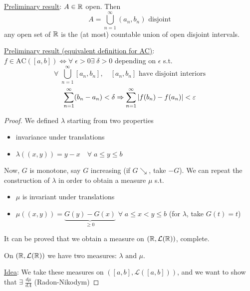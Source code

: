 \noindent\underline{Preliminary result}: \(A \in \mathbb{R}\) open. Then 
\[
    A = \bigcup_{n=1}^{\infty}(a_n, b_n) \mbox{ disjoint}
\]
    any open set of \(\mathbb{R}\) is the (at most) countable union of open disjoint intervals.

\noindent\underline{Preliminary result (equivalent definition for AC)}: \(f \in \mbox{AC}([a,b]) \Leftrightarrow \forall \; \epsilon > 0 \exists \; \delta > 0\) depending on \(\epsilon\) s.t. 
\[
    \forall \; \bigcup_{n=1}^{\infty} [a_n, b_n], \quad [a_n, b_n] \mbox{ have disjoint interiors}
\]
\[
    \sum_{n=1}^{\infty} (b_n -a_n) < \delta \Rightarrow \sum_{n=1}^{\infty} \abs{f(b_n) - f(a_n)} < \varepsilon
\]
\begin{proof}
    We defined \(\lambda\) starting from two properties
    \begin{itemize}
        \item invariance under translations
        \item \(\lambda((x,y)) = y - x \quad \forall \; a \leq  y \leq b\)
    \end{itemize}
    Now, \(G\) is monotone, say \(G\) increasing (if \(G \searrow\), take \(-G\)). We can repeat the construction of \(\lambda\) in order to obtain a measure \(\mu\) s.t. 
    \begin{itemize}
        \item \(\mu\) is invariant under translations
        \item \(\mu((x,y)) = \underbrace{G(y) - G(x)}_{\geq 0}\) \(\forall \; a \leq x < y \leq b\) (for \(\lambda\), take \(G(t) = t\))
    \end{itemize}
It can be proved that we obtain a measure on \((\mathbb{R}, \mathcal{L}(\mathbb{R}))\), complete.

On \((\mathbb{R}, \mathcal{L}(\mathbb{R}))\) we have two measures: \(\lambda \mbox{ and } \mu\).

\noindent\underline{Idea}: We take these measures on \(([a,b], \mathcal{L}([a,b]))\), and we want to show that \(\exists \; \frac{d\mu}{d\Lambda}\) (Radon-Nikodym)


\end{proof}
